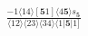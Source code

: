 \documentclass[varwidth, border=5pt]{standalone}
\begin{document}
\begin{my}
$\begin{gathered}
\scriptscriptstyle\frac{-1⟨14⟩[𝟓1]⟨4𝟓⟩s_{𝟓}}{⟨12⟩⟨23⟩⟨34⟩⟨1|𝟓|1]}
\end{gathered}$
\end{my}
\end{document}
